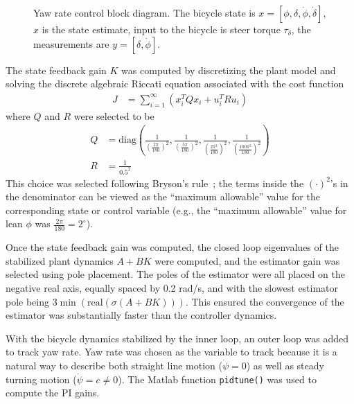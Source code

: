 \begin{figure}[h]
  \caption{Yaw rate control block diagram. The bicycle state is $x=[\phi,
  \delta, \dot{\phi}, \dot{\delta}]$, $\hat{x}$ is the state estimate, input to
  the bicycle is steer torque $\tau_\delta$, the measurements are $y =
  [\delta, \dot{\phi}]$.}
  \label{rb:fig:yr_block_diagram}
\end{figure}
The state feedback gain $K$ was computed by discretizing the plant model and
solving the discrete algebraic Riccati equation associated with the cost
function
\begin{align}
  J &= \sum_{i=1}^{\infty} (x_i^T Q x_i + u_i^T R u_i)
\end{align}
where $Q$ and $R$ were selected to be
\begin{align}
  Q &= \text{diag}(\frac{1}{(\frac{2\pi}{180})^{2}},
                   \frac{1}{(\frac{5\pi}{180})^{2}},
                   \frac{1}{(\frac{2\pi^2}{180})^{2}},
                   \frac{1}{(\frac{100\pi^2}{180})^{2}}) \\
  R &= \frac{1}{0.5^2}
\end{align}
This choice was selected following Bryson's rule~\cite{Bryson1975}; the terms
inside the $(\cdot)^2$'s in the denominator can be viewed as the ``maximum
allowable'' value for the corresponding state or control variable (e.g., the
``maximum allowable'' value for lean $\phi$ was $\frac{2\pi}{180}=2^{\circ}$).

Once the state feedback gain was computed, the closed loop eigenvalues of the
stabilized plant dynamics $A+BK$ were computed, and the estimator gain was
selected using pole placement. The poles of the estimator were all placed on
the negative real axis, equally spaced by 0.2 rad/s, and with the slowest estimator
pole being $3\min(\text{real}(\sigma(A+BK)))$. This ensured the convergence of
the estimator was substantially faster than the controller dynamics.

With the bicycle dynamics stabilized by the inner loop, an outer loop was added
to track yaw rate. Yaw rate was chosen as the variable to track because it is a
natural way to describe both straight line motion ($\dot{\psi}=0$) as well as
steady turning motion ($\dot{\psi}=c\ne0$). The Matlab function
\verb|pidtune()| was used to compute the PI gains.

